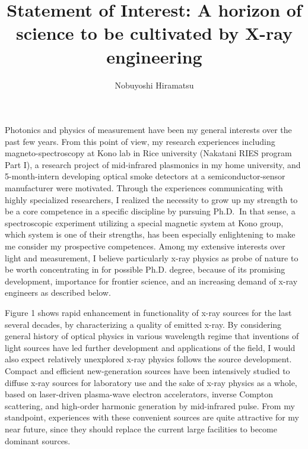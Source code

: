 \documentclass[aps,prb,reprint]{revtex4-1}
\begin{document}
\title{Statement of Interest: A horizon of science to be cultivated by X-ray engineering}
\author{Nobuyoshi Hiramatsu}
\maketitle

Photonics and physics of measurement\cite{Ozawa} have been my general interests over the past few years. From this point of view, my research experiences including magneto-spectroscopy at Kono lab in Rice university (Nakatani RIES program Part I), a research project of mid-infrared plasmonics in my home university, and 5-month-intern developing optical smoke detectors at a semiconductor-sensor manufacturer were motivated. Through the experiences communicating with highly specialized researchers, I realized the necessity to grow up my strength to be a core competence in a specific discipline by pursuing Ph.D. $\:$In that sense, a spectroscopic experiment utilizing a special magnetic system at Kono group, which system is one of their strengths, has been especially enlightening to make me consider my prospective competences. Among my extensive interests over light and measurement, I believe particularly x-ray physics as probe of nature to be worth concentrating in for possible Ph.D. degree, because of its promising development, importance for frontier science, and an increasing demand of x-ray engineers as described below.

Figure 1 shows rapid enhancement in functionality of x-ray sources for the last several decades\cite{Als-Nielsen}, by characterizing a quality of emitted x-ray. By considering general history of optical physics in various wavelength regime that inventions of light sources have led further development and applications of the field, I would also expect relatively unexplored x-ray physics follows the source development. Compact and efficient new-generation sources have been intensively studied to diffuse x-ray sources for laboratory use and the sake of x-ray physics as a whole, based on laser-driven plasma-wave electron accelerators\cite{Hooker}, inverse Compton scattering\cite{Fukuda}, and high-order harmonic generation by mid-infrared pulse\cite{Popmintchev,Weisshaupt}.  
From my standpoint, experiences with these convenient sources are quite attractive for my near future, since they should replace the current large facilities to become dominant sources.
\end{document}
